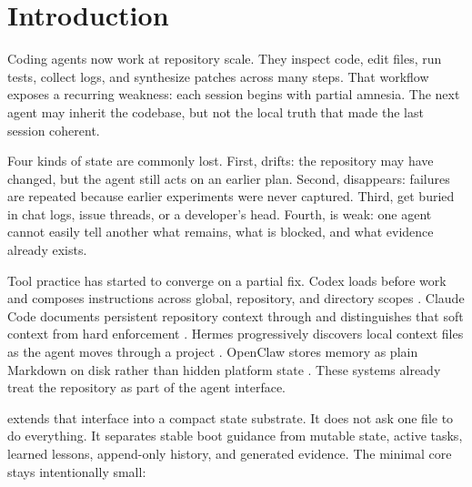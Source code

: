 
\section{Introduction}

Coding agents now work at repository scale. They inspect code, edit files, run tests, collect logs, and synthesize patches across many steps. That workflow exposes a recurring weakness: each session begins with partial amnesia. The next agent may inherit the codebase, but not the local truth that made the last session coherent.



Four kinds of state are commonly lost. First,  drifts: the repository may have changed, but the agent still acts on an earlier plan. Second,  disappears: failures are repeated because earlier experiments were never captured. Third,  get buried in chat logs, issue threads, or a developer's head. Fourth,  is weak: one agent cannot easily tell another what remains, what is blocked, and what evidence already exists.

Tool practice has started to converge on a partial fix. Codex loads  before work and composes instructions across global, repository, and directory scopes \cite{OpenAICodexAgents}. Claude Code documents persistent repository context through  and distinguishes that soft context from hard enforcement \cite{AnthropicClaudeMemory,AnthropicClaudeHooks}. Hermes progressively discovers local context files as the agent moves through a project \cite{HermesContextFiles}. OpenClaw stores memory as plain Markdown on disk rather than hidden platform state \cite{OpenClawMemory}. These systems already treat the repository as part of the agent interface.

\systemname{} extends that interface into a compact state substrate. It does not ask one file to do everything. It separates stable boot guidance from mutable state, active tasks, learned lessons, append-only history, and generated evidence. The minimal core stays intentionally small:

